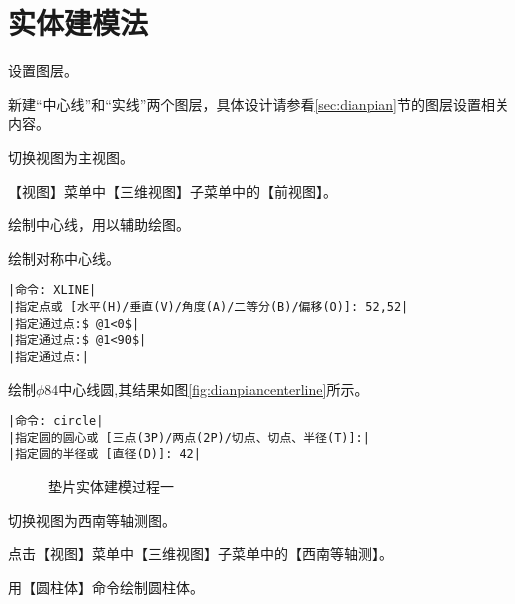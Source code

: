 \section{实体建模法}
\begin{procedure}
\item 设置图层。

新建“中心线”和“实线”两个图层，具体设计请参看\ref{sec:dianpian}节的图层设置相关内容。
\item 切换视图为主视图。

【视图】菜单中【三维视图】子菜单中的【前视图】。
\item 绘制中心线，用以辅助绘图。

绘制对称中心线。
\begin{lstlisting}
|命令: XLINE|
|指定点或 [水平(H)/垂直(V)/角度(A)/二等分(B)/偏移(O)]: 52,52|
|指定通过点:$ @1<0$|
|指定通过点:$ @1<90$|
|指定通过点:|
\end{lstlisting}
绘制$\phi 84$中心线圆,其结果如图\ref{fig:dianpiancenterline}所示。
\begin{lstlisting}
|命令: circle|
|指定圆的圆心或 [三点(3P)/两点(2P)/切点、切点、半径(T)]:|
|指定圆的半径或 [直径(D)]: 42|
\end{lstlisting}
\begin{figure}[htbp]
\centering
{}\hspace{30pt}
\caption{垫片实体建模过程一}
\end{figure}
\item 切换视图为西南等轴测图。

点击【视图】菜单中【三维视图】子菜单中的【西南等轴测】。
\item 用【圆柱体】命令绘制圆柱体。


\end{procedure}
